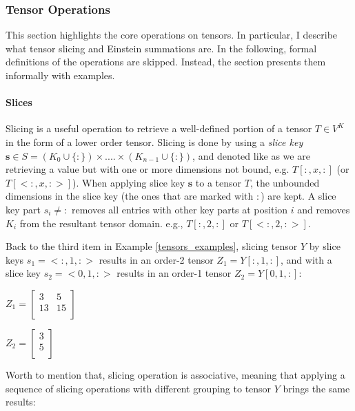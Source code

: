 \subsubsection{Tensor Operations}
\label{sec:tensor_operations}
This section highlights the core operations on tensors. In particular, I describe what tensor slicing and Einstein summations are. In the following, formal definitions of the operations are skipped. Instead, the section presents them informally with examples.


\paragraph{Slices} Slicing is a useful operation to retrieve a well-defined portion of a tensor $T \in V^{K}$ in the form of a lower order tensor. Slicing is done by using a \textit{slice key} $\textbf{s} \in S = (K_0 \cup \{:\}) \times .... \times ( K_{n-1}\cup \{:\})$, and denoted like as we are retrieving a value but with one or more dimensions not bound, e.g. $T[:, x, :]$ (or $T[<:, x, :>]$). 
When applying slice key $\textbf{s}$ to a tensor $T$, the unbounded dimensions in the slice key (the ones that are marked with $:$) are kept. 
A slice key part $s_i \neq :$ removes
all entries with other key parts at position $i$ and removes $K_i$ from the resultant tensor domain. e.g., $T[:, 2, :]$ or $T[<:, 2, :>]$.

\begin{example}
	\label{ex:tensor_slicing}
	Back to the third item in Example \ref{tensors_examples}, slicing tensor $Y$ by slice keys $s_1 = <:, 1, :>$ results in an order-2 tensor $Z_1 = Y[:, 1, :]$, and with a slice key $s_2 = <0, 1, :>$ results in an order-1 tensor $Z_2 = Y[0, 1, :]$:\\
	
	 \centerline{$Z_1 = \left[ \begin{array}{cc} 3 & 5\\ 13 & 15 \\ \end{array}\right]$}  
	 
	 
	 \centerline{$Z_2 = \left[ \begin{array}{c} 3 \\ 5 \\ \end{array}\right]$} 
\end{example}

Worth to mention that, slicing operation is associative, meaning that applying a sequence of slicing operations with different grouping to tensor $Y$ brings the same results:

